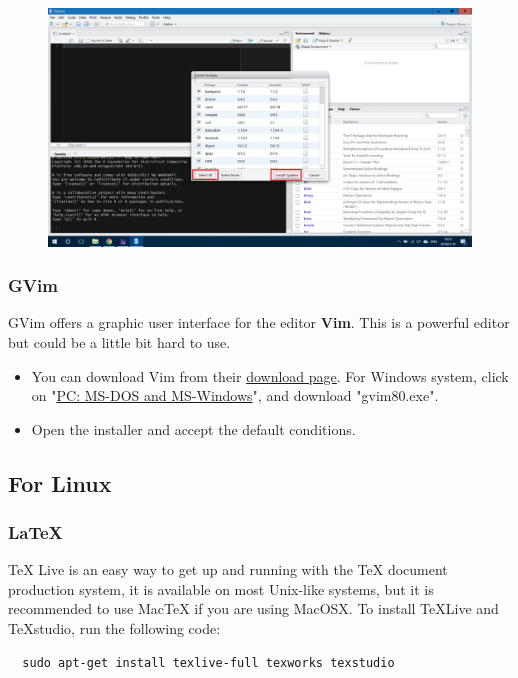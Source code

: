 \documentclass[10pt]{article} %
\begin{document}
\begin{itemize}
  \begin{figure}[h!]
    \centering
    \includegraphics[width=0.7\linewidth]{figs/upgradePackages}
    \caption{}
    \label{fig:upgradepackages}
  \end{figure}

\end{itemize}

\subsubsection{GVim}

GVim offers a graphic user interface for the editor \textbf{Vim}.
This is a powerful editor but could be a little bit hard to use.
\begin{itemize}
  \item You can download Vim from their \href{https://vim.sourceforge.io/download.php}{download page}.
  For Windows system, click on "\href{https://vim.sourceforge.io/download.php#pc}{PC: MS-DOS and MS-Windows}", and download "gvim80.exe".
  \item Open the installer and accept the default conditions.
\end{itemize}

\subsection{For Linux}

\subsubsection{LaTeX}

TeX Live is an easy way to get up and running with the TeX document production system, it is available on most Unix-like systems, but it is recommended to use MacTeX if you are using MacOSX.
To install TeXLive and TeXstudio, run the following code:
\begin{lstlisting}
  sudo apt-get install texlive-full texworks texstudio
\end{lstlisting}
\end{document}
